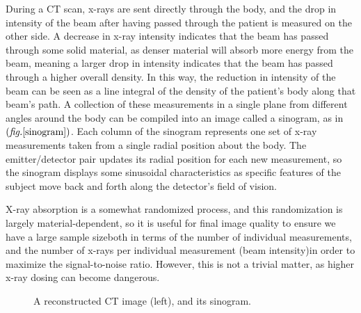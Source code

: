 \documentclass[sigconf,twocolumn,nonacm=true]{acmart}
\newcommand{\emd}{\text{\textemdash}} %
\newcommand{\enc}[1]{\left( #1 \right)} %
\newcommand{\fig}[1]{$\enc{\textit{fig.}\ref{#1}}$}
\begin{document}
During a CT scan, x-rays are sent directly through the body, and the drop in intensity of the beam after having passed through the patient is measured on the other side. A decrease in x-ray intensity indicates that the beam has passed through some solid material, as denser material will absorb more energy from the beam, meaning a larger drop in intensity indicates that the beam has passed through a higher overall density. In this way, the reduction in intensity of the beam can be seen as a line integral of the density of the patient's body along that beam's path. A collection of these measurements in a single plane from different angles around the body can be compiled into an image called a sinogram, as in \fig{sinogram}. Each column of the sinogram represents one set of x-ray measurements taken from a single radial position about the body. The emitter/detector pair updates its radial position for each new measurement, so the sinogram displays some sinusoidal characteristics as specific features of the subject move back and forth along the detector's field of vision.

X-ray absorption is a somewhat randomized process, and this randomization is largely material-dependent, so it is useful for final image quality to ensure we have a large sample size\emd both in terms of the number of individual measurements, and the number of x-rays per individual measurement (beam intensity)\emd in order to maximize the signal-to-noise ratio. However, this is not a trivial matter, as higher x-ray dosing can become dangerous.

\begin{figure}[t]
    \centering
    \vspace*{7pt}
    \caption{A reconstructed CT image (left), and its sinogram.}
    \label{sinogram}
\end{figure}
\end{document}
